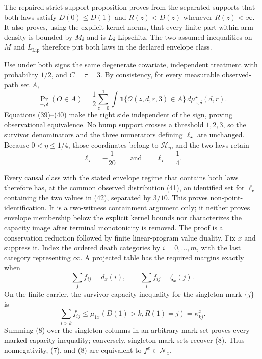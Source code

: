 The repaired strict-support proposition proves from the separated supports that both laws satisfy \(D(0)\leq D(1)\) and \(R(z)<D(z)\) whenever \(R(z)<\infty\).  It also proves, using the explicit kernel norms, that every finite-part within-arm density is bounded by \(M_\delta\) and is \(L_\delta\)-Lipschitz.  The two assumed inequalities on \(M\) and \(L_{\mathrm{Lip}}\) therefore put both laws in the declared envelope class.

Use under both signs the same degenerate covariate, independent treatment with probability \(1/2\), and \(C=\tau=3\).  By consistency, for every measurable observed-path set \(A\),
\[
\Pr_{\pm,\delta}(O\in A)
=\frac12\sum_{z=0}^1
\int\mathbf 1\{\mathcal O(z,d,r,3)\in A\}\,
d\mu_{z,\delta}^\star(d,r).                                        \tag{41}
\]
Equations (39)--(40) make the right side independent of the sign, proving observational equivalence.  No bump support crosses a threshold \(1,2,3\), so the survivor denominators and the three numerators defining \(\ell_\star\) are unchanged.  Because \(0<\eta\leq1/4\), those coordinates belong to \(\mathcal H_\eta\), and the two laws retain
\[
\ell_\star=-\frac1{20}
\qquad\text{and}\qquad
\ell_\star=\frac14.                                                 \tag{42}
\]

Every causal class with the stated envelope regime that contains both laws therefore has, at the common observed distribution (41), an identified set for \(\ell_\star\) containing the two values in (42), separated by \(3/10\).  This proves non-point-identification.  It is a two-witness containment argument only; it neither proves envelope membership below the explicit kernel bounds nor characterizes the capacity image after terminal monotonicity is removed.
The proof is a conservation reduction followed by finite linear-program value duality.  Fix \(x\) and suppress it.  Index the ordered death categories by \(i=0,\ldots,m\), with the last category representing \(\infty\).  A projected table has the required margins exactly when
\[
\sum_j f_{ij}=d_x(i),
\qquad
\sum_i f_{ij}=\zeta_x(j).                                           \tag{7}
\]
On the finite carrier, the survivor-capacity inequality for the singleton mark \(\{j\}\) is
\[
\sum_{i>k}f_{ij}\leq
\mu_{1x}(D(1)>k,R(1)=j)=\kappa^x_{kj}.                              \tag{8}
\]
Summing (8) over the singleton columns in an arbitrary mark set proves every marked-capacity inequality; conversely, singleton mark sets recover (8).  Thus nonnegativity, (7), and (8) are equivalent to \(f^x\in\mathcal N_x\).

